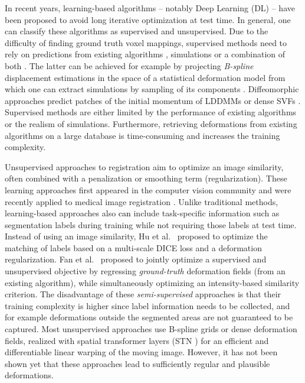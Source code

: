 \documentclass[journal]{IEEEtran}
\newcommand{\update}[1]{\textcolor{black}{#1}}
\begin{document}
In recent years, learning-based algorithms -- notably Deep Learning (DL) -- have been proposed to avoid long iterative optimization at test time. In general, one can classify these algorithms as supervised and unsupervised. Due to the difficulty of finding ground truth voxel mappings, supervised methods need to rely on predictions from existing algorithms \cite{yang2017quicksilver,rohe2017svf}, simulations \cite{sokooti2017nonrigid,uzunova2017training,eppenhof2018deformable} or a combination of both \cite{krebs2017robust,mahapatra2018deformable}. The latter can be achieved for example by projecting \emph{B-spline} displacement estimations in the space of a statistical deformation model from which one can extract simulations by sampling of its components \cite{krebs2017robust}. Diffeomorphic approaches predict patches of the initial momentum of LDDMMs \cite{yang2017quicksilver} or dense SVFs \cite{rohe2017svf}. Supervised methods are either limited by the performance of existing algorithms or the realism of simulations. Furthermore, retrieving deformations from existing algorithms on a large database is time-consuming and increases the training complexity.

Unsupervised approaches to registration aim to optimize an image similarity, often combined with a penalization or smoothing term (regularization). These learning approaches first appeared in the computer vision community \cite{jason2016back,liang2017dual} and were recently applied to medical image registration \cite{de2017end,balakrishnan2018unsupervised,fan2018birnet,dalca2018unsupervised,tanner2018generative}. Unlike traditional methods, learning-based approaches also \update{can} include task-specific information such as segmentation labels during training while not requiring those labels at test time. Instead of using an image similarity, Hu et al.~\cite{hu2018weakly} proposed to optimize the matching of labels based on a multi-scale DICE loss and a deformation regularization. Fan et al.~\cite{fan2018birnet} proposed to jointly optimize a supervised and unsupervised objective by regressing \emph{ground-truth} deformation fields (from an existing algorithm), while simultaneously optimizing an intensity-based similarity criterion. The disadvantage of these \emph{semi-supervised} approaches is that their training complexity is higher since label information needs to be collected, and for example deformations outside the segmented areas are not guaranteed to be captured. 
Most unsupervised approaches use B-spline grids or dense deformation fields, realized with spatial transformer layers (STN \cite{jaderberg2015spatial}) for an efficient and differentiable linear warping of the moving image. However, it has not been shown yet that these approaches lead to sufficiently regular and plausible deformations. 
\end{document}
